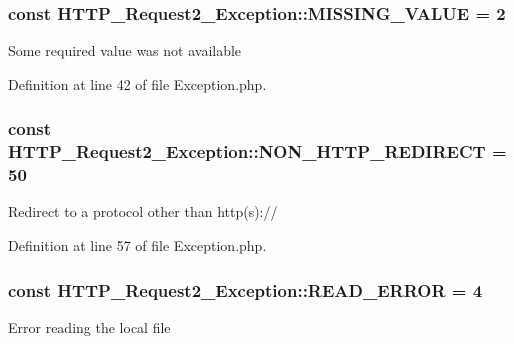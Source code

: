 \subsubsection[{\texorpdfstring{M\+I\+S\+S\+I\+N\+G\+\_\+\+V\+A\+L\+UE}{MISSING_VALUE}}]{\setlength{\rightskip}{0pt plus 5cm}const H\+T\+T\+P\+\_\+\+Request2\+\_\+\+Exception\+::\+M\+I\+S\+S\+I\+N\+G\+\_\+\+V\+A\+L\+UE = 2}\hypertarget{classHTTP__Request2__Exception_af25f90a5d31c28cfc9da9ea7b3b8fbb8}{}\label{classHTTP__Request2__Exception_af25f90a5d31c28cfc9da9ea7b3b8fbb8}
Some required value was not available 

Definition at line 42 of file Exception.\+php.

\subsubsection[{\texorpdfstring{N\+O\+N\+\_\+\+H\+T\+T\+P\+\_\+\+R\+E\+D\+I\+R\+E\+CT}{NON_HTTP_REDIRECT}}]{\setlength{\rightskip}{0pt plus 5cm}const H\+T\+T\+P\+\_\+\+Request2\+\_\+\+Exception\+::\+N\+O\+N\+\_\+\+H\+T\+T\+P\+\_\+\+R\+E\+D\+I\+R\+E\+CT = 50}\hypertarget{classHTTP__Request2__Exception_a9e2ad085db3df15cf825d54e14086b98}{}\label{classHTTP__Request2__Exception_a9e2ad085db3df15cf825d54e14086b98}
Redirect to a protocol other than http(s)\+:// 

Definition at line 57 of file Exception.\+php.

\subsubsection[{\texorpdfstring{R\+E\+A\+D\+\_\+\+E\+R\+R\+OR}{READ_ERROR}}]{\setlength{\rightskip}{0pt plus 5cm}const H\+T\+T\+P\+\_\+\+Request2\+\_\+\+Exception\+::\+R\+E\+A\+D\+\_\+\+E\+R\+R\+OR = 4}\hypertarget{classHTTP__Request2__Exception_a9167d1901f61ab9f5ec9271b41fe340e}{}\label{classHTTP__Request2__Exception_a9167d1901f61ab9f5ec9271b41fe340e}
Error reading the local file 

